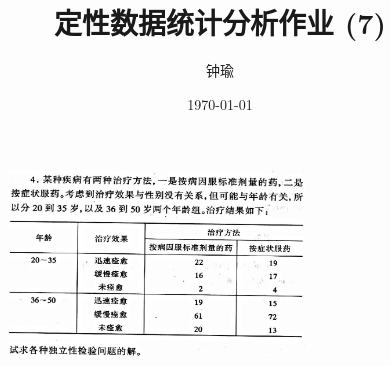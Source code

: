 \documentclass[11pt,a4paper]{ctexart}
\title{定性数据统计分析作业 (7)}
\author{钟瑜 \quad 222018314210044}
\date{\today}
\begin{document}
\maketitle
\pagestyle{plain}%
\begin{figure}[H]
	\centering
	\includegraphics[width=0.7\textwidth]{screenshot002}
	\label{fig:screenshot002}
\end{figure}
\end{document}

